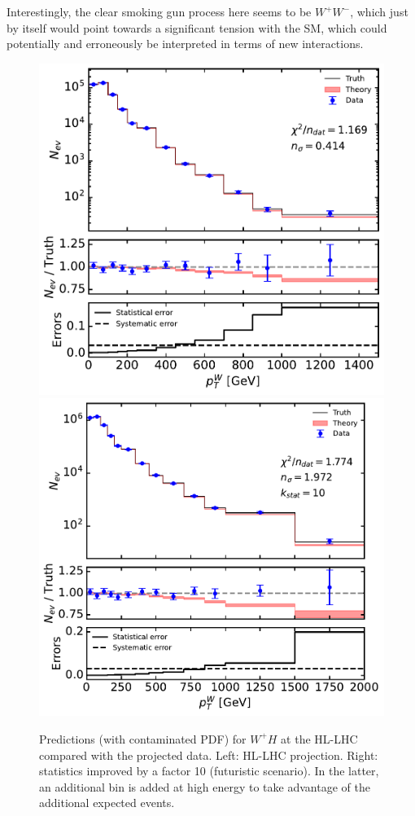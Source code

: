 \documentclass[withindex,glossary]{cam-thesis}
\begin{document}
Interestingly, the clear smoking gun process here seems to be $W^+ W^-$, which just by 
itself would point towards a significant tension with the SM, which could potentially and erroneously be interpreted in terms of new interactions.
%
\begin{figure}[H]
  \includegraphics[scale=0.45]{Figures/plot_wph_hllhc_with_fluct.pdf}
  \includegraphics[scale=0.45]{Figures/plot_wph_hllhc_with_fluct_opt_unc.pdf}
  \caption{Predictions (with contaminated PDF) for $W^+ H$ at the HL-LHC compared with the projected data. Left: HL-LHC projection. Right: statistics improved by a factor 10 (futuristic scenario). In the latter, an additional bin is added at high energy to take advantage of the additional expected events.}
  \label{fig:wph_hllhc}
      \end{figure}
\end{document}
